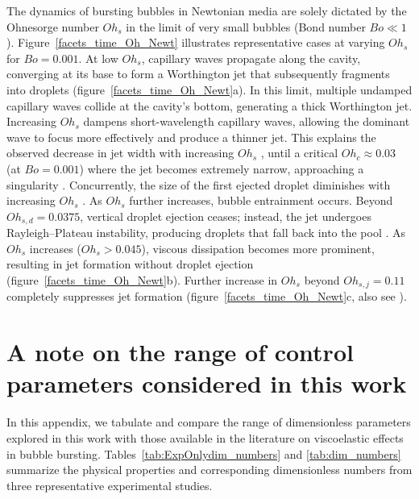 \documentclass{jfm}
\newcommand{\oo}{\color{black} \normalfont}
\begin{document}
The dynamics of bursting bubbles in Newtonian media are solely dictated by the Ohnesorge number $Oh_s$ in the limit of very small bubbles (Bond number $Bo \ll 1$).
Figure~\ref{facets_time_Oh_Newt} illustrates representative cases at varying $Oh_s$ for $Bo = 0.001$. At low $Oh_s$, capillary waves propagate along the cavity, converging at its base to form a Worthington jet that subsequently fragments into droplets (figure~\ref{facets_time_Oh_Newt}a). In this limit, multiple undamped capillary waves collide at the cavity's bottom, generating a thick Worthington jet. Increasing $Oh_s$ dampens short-wavelength capillary waves, allowing the dominant wave to focus more effectively and produce a thinner jet. This explains the observed decrease in jet width with increasing $Oh_s$ \citep{gordillo2023theory}, until a critical $Oh_c \approx 0.03$ (at $Bo=0.001$) where the jet becomes extremely narrow, approaching a singularity \citep{blanco2020sea}. Concurrently, the size of the first ejected droplet diminishes with increasing $Oh_s$ \citep{gordillo2019capillary}.
As $Oh_s$ further increases, bubble entrainment occurs. Beyond $Oh_{s, d} = 0.0375$, vertical droplet ejection ceases; instead, the jet undergoes Rayleigh--Plateau instability, producing droplets that fall back into the pool \citep{blanco2020sea, walls2015jet, deike2018dynamics}. As $Oh_s$ increases ($Oh_s > 0.045$), viscous dissipation becomes more prominent, resulting in jet formation without droplet ejection (figure~\ref{facets_time_Oh_Newt}b). Further increase in $Oh_s$ beyond $Oh_{s,j} = 0.11$ completely suppresses jet formation (figure~\ref{facets_time_Oh_Newt}c, also see \citet{sanjay-2022-JFM}).

\oo
\section{A note on the range of control parameters considered in this work}
\label{app:accounting}
\renewcommand{\thetable}{\Alph{section}\,\arabic{table}}
\setcounter{table}{0}

In this appendix, we tabulate and compare the range of dimensionless parameters explored in this work with those available in the literature on viscoelastic effects in bubble bursting. Tables~\ref{tab:ExpOnlydim_numbers} and \ref{tab:dim_numbers} summarize the physical properties and corresponding dimensionless numbers from three representative experimental studies.
\end{document}
